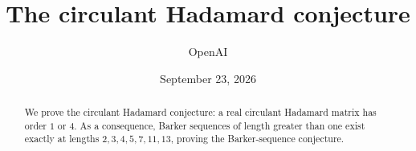 \documentclass[11pt]{article}
\title{The circulant Hadamard conjecture}
\author{OpenAI}
\date{September 23, 2026}
\begin{document}
\maketitle
\begin{abstract}
We prove the circulant Hadamard conjecture: a real circulant Hadamard
matrix has order $1$ or $4$. As a consequence, Barker sequences of
length greater than one exist exactly at lengths $2,3,4,5,7,11,13$,
proving the Barker-sequence conjecture.
\end{abstract}






\begingroup
\RaggedRight

\endgroup
\end{document}
